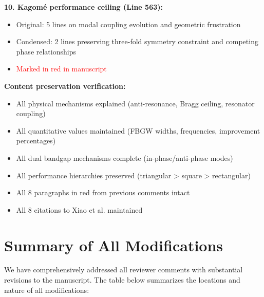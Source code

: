 \documentclass[11pt,a4paper]{article}
\newenvironment{changesbox}{%
    \par\medskip\noindent{\color{changescolor}\rule{\linewidth}{2pt}}\par
    \noindent{\color{changescolor}\bfseries Manuscript Changes}\par\smallskip
}{%
    \par\noindent{\color{changescolor}\rule{\linewidth}{0.5pt}}\medskip
}
\begin{document}
\begin{changesbox}
\textbf{10. Kagom\'{e} performance ceiling (Line 563):}
\begin{itemize}
    \item Original: 5 lines on modal coupling evolution and geometric frustration
    \item Condensed: 2 lines preserving three-fold symmetry constraint and competing phase relationships
    \item \textcolor{red}{Marked in red in manuscript}
\end{itemize}

\textbf{Content preservation verification:}
\begin{itemize}
    \item \checkmark All physical mechanisms explained (anti-resonance, Bragg ceiling, resonator coupling)
    \item \checkmark All quantitative values maintained (FBGW widths, frequencies, improvement percentages)
    \item \checkmark All dual bandgap mechanisms complete (in-phase/anti-phase modes)
    \item \checkmark All performance hierarchies preserved (triangular > square > rectangular)
    \item \checkmark All 8 paragraphs in red from previous comments intact
    \item \checkmark All 8 citations to Xiao et al. maintained
\end{itemize}
\end{changesbox}

\newpage

\section*{Summary of All Modifications}

We have comprehensively addressed all reviewer comments with substantial revisions to the manuscript. The table below summarizes the locations and nature of all modifications:
\end{document}
